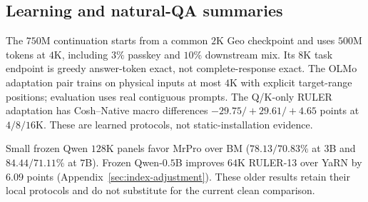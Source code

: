 \subsection{Learning and natural-QA summaries}
\label{sec:learning-summary}
The $750$M continuation starts from a common $2$K Geo checkpoint and uses
$500$M tokens at $4$K, including $3\%$ passkey and $10\%$ downstream mix.
Its $8$K task endpoint is greedy answer-token exact, not complete-response exact.
The OLMo adaptation pair trains on physical inputs at most $4$K with explicit
target-range positions; evaluation uses real contiguous prompts. The Q/K-only
RULER adaptation has Cosh--Native macro differences $-29.75/+29.61/+4.65$
points at $4/8/16$K. These are learned protocols, not static-installation evidence.


Small frozen Qwen $128$K panels favor MrPro over BM ($78.13/70.83\%$ at $3$B
and $84.44/71.11\%$ at $7$B). Frozen Qwen-$0.5$B improves $64$K RULER-13 over
YaRN by $6.09$ points (Appendix~\ref{sec:index-adjustment}). These older results
retain their local protocols and do not substitute for the current clean comparison.
